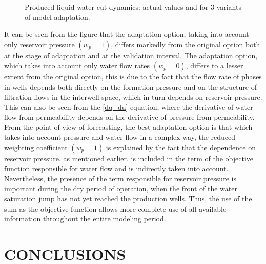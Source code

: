 \documentclass[
11pt,%
tightenlines,%
twoside,%
onecolumn,%
nofloats,%
nobibnotes,%
nofootinbib,%
superscriptaddress,%
noshowpacs,%
centertags]%
{revtex4}
\begin{document}
\begin{figure}
	\caption{Produced liquid water cut dynamics: actual values and for 3 variants of model adaptation.}
	\label{fig:wtс}
\end{figure}
It can be seen from the figure that the adaptation option, taking into account only reservoir pressure $(w_p=1)$, differs markedly from the original option both at the stage of adaptation and at the validation interval. The adaptation option, which takes into account only water flow rates $(w_p=0)$, differs to a lesser extent from the original option, this is due to the fact that the flow rate of phases in wells depends both directly on the formation pressure and on the structure of filtration flows in the interwell space, which in turn depends on reservoir pressure. This can also be seen from the \ref{dq_du} equation, where the derivative of water flow from permeability depends on the derivative of pressure from permeability. From the point of view of forecasting, the best adaptation option is that which takes into account pressure and water flow in a complex way, the reduced weighting coefficient $(w_p=1)$ is explained by the fact that the dependence on reservoir pressure, as mentioned earlier, is included in the term of the objective function responsible for water flow and is indirectly taken into account. Nevertheless, the presence of the term responsible for reservoir pressure is important during the dry period of operation, when the front of the water saturation jump has not yet reached the production wells. Thus, the use of the sum as the objective function allows more complete use of all available information throughout the entire modeling period.

\section{CONCLUSIONS}
\end{document}
